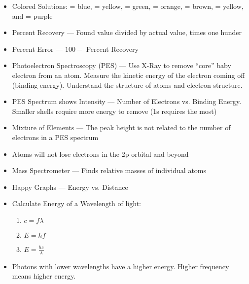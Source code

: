 \documentclass[12pt]{article}
\begin{document}
\begin{itemize}
  \item Colored Solutions:  = blue,  = yellow,  = green,  = orange,  = brown,  = yellow, and  = purple

  \item Percent Recovery — Found value divided by actual value, times one hunder

  \item Percent Error — $100-$ Percent Recovery

  \item Photoelectron Spectroscopy (PES) — Use X-Ray to remove “core” baby electron from an atom. Measure the kinetic energy of the electron coming off (binding energy). Understand the structure of atoms and electron structure.

  \item PES Spectrum shows Intensity — Number of Electrons vs. Binding Energy. Smaller shells require more energy to remove (1s requires the most)

  \item Mixture of Elements — The peak height is not related to the number of electrons in a PES spectrum

  \item Atoms will not lose electrons in the 2p orbital and beyond

  \item Mass Spectrometer — Finds relative masses of individual atoms

  \item Happy Graphs — Energy vs. Distance

  \item Calculate Energy of a Wavelength of light:

    \begin{enumerate}

      \item $c=f\lambda$

      \item $E=hf$

      \item $E=\frac{hc}{\lambda}$
        
    \end{enumerate}

  \item Photons with lower wavelengths have a higher energy. Higher frequency means higher energy.

\end{itemize}
\end{document}
